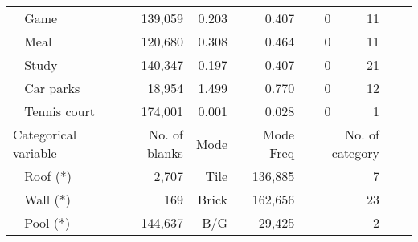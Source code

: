\begin{table}[ht]
{\begin{threeparttable}
\begin{tabular}{lrrrrrrr}
$~~~~$Game                &139,059            &0.203  &0.407   &0      &11\\
$~~~~$Meal                &120,680            &0.308  &0.464   &0      &11\\
$~~~~$Study               &140,347            &0.197  &0.407   &0      &21\\
$~~~~$Car parks           &18,954             &1.499  &0.770   &0      &12\\
$~~~~$Tennis court        &174,001            &0.001  &0.028   &0      &1\\
\hline
Categorical variable &No. of blanks     &Mode   &Mode Freq &\multicolumn{2}{r}{No. of category}\\
\hline
$~~~~$Roof (*)            &2,707              &Tile   &136,885   &\multicolumn{2}{r}{7}\\
$~~~~$Wall (*)            &169                &Brick  &162,656   &\multicolumn{2}{r}{23}\\
$~~~~$Pool (*)            &144,637            &B/G    &29,425    &\multicolumn{2}{r}{2}\\
\bottomrule\bottomrule
\end{tabular}
\end{threeparttable}}
\end{table}
